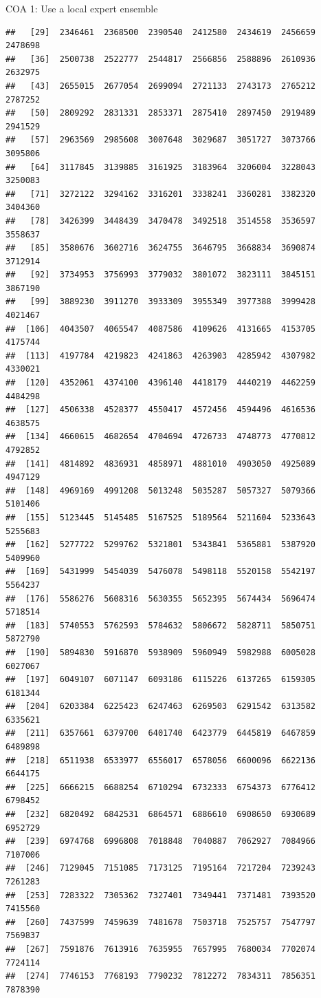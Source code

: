 \documentclass[ignorenonframetext,]{beamer}
\begin{document}
\begin{frame}[fragile]{COA 1: Use a local expert ensemble}
\begin{verbatim}
##   [29]  2346461  2368500  2390540  2412580  2434619  2456659  2478698
##   [36]  2500738  2522777  2544817  2566856  2588896  2610936  2632975
##   [43]  2655015  2677054  2699094  2721133  2743173  2765212  2787252
##   [50]  2809292  2831331  2853371  2875410  2897450  2919489  2941529
##   [57]  2963569  2985608  3007648  3029687  3051727  3073766  3095806
##   [64]  3117845  3139885  3161925  3183964  3206004  3228043  3250083
##   [71]  3272122  3294162  3316201  3338241  3360281  3382320  3404360
##   [78]  3426399  3448439  3470478  3492518  3514558  3536597  3558637
##   [85]  3580676  3602716  3624755  3646795  3668834  3690874  3712914
##   [92]  3734953  3756993  3779032  3801072  3823111  3845151  3867190
##   [99]  3889230  3911270  3933309  3955349  3977388  3999428  4021467
##  [106]  4043507  4065547  4087586  4109626  4131665  4153705  4175744
##  [113]  4197784  4219823  4241863  4263903  4285942  4307982  4330021
##  [120]  4352061  4374100  4396140  4418179  4440219  4462259  4484298
##  [127]  4506338  4528377  4550417  4572456  4594496  4616536  4638575
##  [134]  4660615  4682654  4704694  4726733  4748773  4770812  4792852
##  [141]  4814892  4836931  4858971  4881010  4903050  4925089  4947129
##  [148]  4969169  4991208  5013248  5035287  5057327  5079366  5101406
##  [155]  5123445  5145485  5167525  5189564  5211604  5233643  5255683
##  [162]  5277722  5299762  5321801  5343841  5365881  5387920  5409960
##  [169]  5431999  5454039  5476078  5498118  5520158  5542197  5564237
##  [176]  5586276  5608316  5630355  5652395  5674434  5696474  5718514
##  [183]  5740553  5762593  5784632  5806672  5828711  5850751  5872790
##  [190]  5894830  5916870  5938909  5960949  5982988  6005028  6027067
##  [197]  6049107  6071147  6093186  6115226  6137265  6159305  6181344
##  [204]  6203384  6225423  6247463  6269503  6291542  6313582  6335621
##  [211]  6357661  6379700  6401740  6423779  6445819  6467859  6489898
##  [218]  6511938  6533977  6556017  6578056  6600096  6622136  6644175
##  [225]  6666215  6688254  6710294  6732333  6754373  6776412  6798452
##  [232]  6820492  6842531  6864571  6886610  6908650  6930689  6952729
##  [239]  6974768  6996808  7018848  7040887  7062927  7084966  7107006
##  [246]  7129045  7151085  7173125  7195164  7217204  7239243  7261283
##  [253]  7283322  7305362  7327401  7349441  7371481  7393520  7415560
##  [260]  7437599  7459639  7481678  7503718  7525757  7547797  7569837
##  [267]  7591876  7613916  7635955  7657995  7680034  7702074  7724114
##  [274]  7746153  7768193  7790232  7812272  7834311  7856351  7878390

\end{verbatim}
\end{frame}
\end{document}
